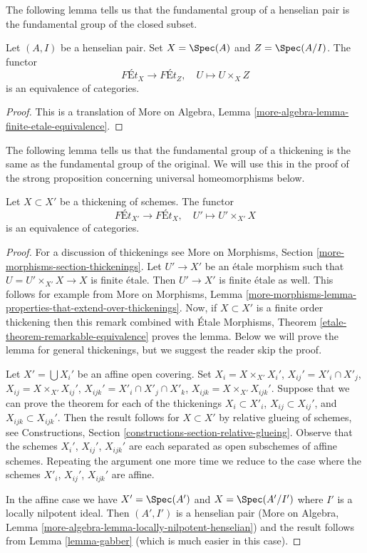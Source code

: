 \noindent
The following lemma tells us that the fundamental group of a henselian
pair is the fundamental group of the closed subset.

\begin{lemma}
\label{lemma-gabber}
Let $(A, I)$ be a henselian pair. Set $X = \Spec(A)$ and $Z = \Spec(A/I)$.
The functor
$$
\textit{F\'Et}_X \longrightarrow \textit{F\'Et}_Z,\quad
U \longmapsto U \times_X Z
$$
is an equivalence of categories.
\end{lemma}

\begin{proof}
This is a translation of
More on Algebra, Lemma \ref{more-algebra-lemma-finite-etale-equivalence}.
\end{proof}

\noindent
The following lemma tells us that the fundamental group of a thickening
is the same as the fundamental group of the original. We will use this
in the proof of the strong proposition concerning universal homeomorphisms
below.

\begin{lemma}
\label{lemma-thickening}
Let $X \subset X'$ be a thickening of schemes. The functor
$$
\textit{F\'Et}_{X'} \longrightarrow \textit{F\'Et}_X,\quad
U' \longmapsto U' \times_{X'} X
$$
is an equivalence of categories.
\end{lemma}

\begin{proof}
For a discussion of thickenings see
More on Morphisms, Section \ref{more-morphisms-section-thickenings}.
Let $U' \to X'$ be an \'etale morphism such that $U = U' \times_{X'} X \to X$
is finite \'etale. Then $U' \to X'$ is finite \'etale as well.
This follows for example from More on Morphisms, Lemma
\ref{more-morphisms-lemma-properties-that-extend-over-thickenings}.
Now, if $X \subset X'$ is a finite order thickening then this remark
combined with \'Etale Morphisms, Theorem
\ref{etale-theorem-remarkable-equivalence}
proves the lemma. Below we will prove the lemma for general thickenings, but
we suggest the reader skip the proof.

\medskip\noindent
Let $X' = \bigcup X_i'$ be an affine open covering. Set
$X_i = X \times_{X'} X_i'$, $X_{ij}' = X'_i \cap X'_j$,
$X_{ij} = X \times_{X'} X_{ij}'$, $X_{ijk}' = X'_i \cap X'_j \cap X'_k$,
$X_{ijk} = X \times_{X'} X_{ijk}'$.
Suppose that we can prove
the theorem for each of the thickenings
$X_i \subset X'_i$, $X_{ij} \subset X_{ij}'$, and $X_{ijk} \subset X_{ijk}'$.
Then the result follows for $X \subset X'$ by relative glueing of
schemes, see
Constructions, Section \ref{constructions-section-relative-glueing}.
Observe that the schemes $X_i'$, $X_{ij}'$, $X_{ijk}'$ are
each separated as open subschemes of affine schemes. Repeating the
argument one more time we reduce to the case where the schemes
$X'_i$, $X_{ij}'$, $X_{ijk}'$ are affine.

\medskip\noindent
In the affine case we have $X' = \Spec(A')$ and $X = \Spec(A'/I')$
where $I'$ is a locally nilpotent ideal. Then $(A', I')$ is a
henselian pair (More on Algebra, Lemma
\ref{more-algebra-lemma-locally-nilpotent-henselian})
and the result follows from Lemma \ref{lemma-gabber} (which is
much easier in this case).
\end{proof}

